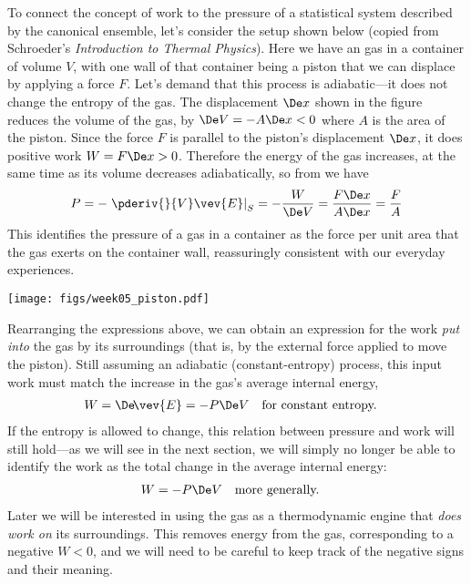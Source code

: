 To connect the concept of work to the pressure of a statistical system described by the canonical ensemble, let's consider the setup shown below (copied from Schroeder's \textit{Introduction to Thermal Physics}).
Here we have an gas in a container of volume $V$, with one wall of that container being a piston that we can displace by applying a force $F$.
Let's demand that this process is adiabatic---it does not change the entropy of the gas.
The displacement $\De x$ shown in the figure reduces the volume of the gas, by $\De V = -A\De x < 0$ where $A$ is the area of the piston.
Since the force $F$ is parallel to the piston's displacement $\De x$, it does positive work $W = F\De x > 0$.
Therefore the energy of the gas increases, at the same time as its volume decreases adiabatically, so from  we have
\begin{equation}
  P = -\left. \pderiv{}{V} \vev{E}\right|_S = -\frac{W}{\De V} = \frac{F\De x}{A\De x} = \frac{F}{A}
\end{equation}
This identifies the pressure of a gas in a container as the force per unit area that the gas exerts on the container wall, reassuringly consistent with our everyday experiences.

\begin{center}
  \texttt{[image: figs/week05\_piston.pdf]}
\end{center}

Rearranging the expressions above, we can obtain an expression for the work \textit{put into} the gas by its surroundings (that is, by the external force applied to move the piston).
Still assuming an adiabatic (constant-entropy) process, this input work must match the increase in the gas's average internal energy,
\begin{align*}
  W & = \De\!\vev{E} = -P \De V & & \mbox{for constant entropy.}
\end{align*}
If the entropy is allowed to change, this relation between pressure and work will still hold---as we will see in the next section, we will simply no longer be able to identify the work as the total change in the average internal energy:
\begin{align}
  \label{eq:work_constP}
  W & = -P \De V & & \mbox{more generally.}
\end{align}
Later we will be interested in using the gas as a thermodynamic engine that \textit{does work on} its surroundings.
This removes energy from the gas, corresponding to a negative $W < 0$, and we will need to be careful to keep track of the negative signs and their meaning.

